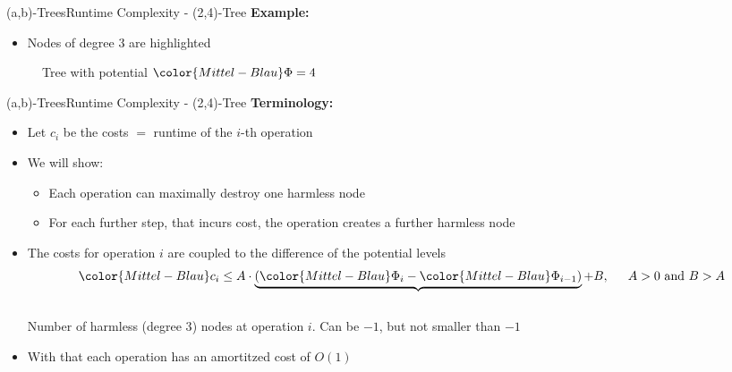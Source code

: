 \begin{frame}{(a,b)-Trees}{Runtime Complexity - (2,4)-Tree}
  \textbf{Example:}
  \begin{itemize}
    \item<2->
      Nodes of {\color{Mittel-Blau}degree 3} are highlighted
  \end{itemize}
  \begin{figure}[!h]
    \begin{adjustbox}{width=0.8\linewidth}
      
    \end{adjustbox}
    \caption{Tree with potential ${\color{Mittel-Blau}\Phi} = 4$}
    \label{fig:a_b_tree:potential_introduction}
  \end{figure}
\end{frame}


\begin{frame}{(a,b)-Trees}{Runtime Complexity - (2,4)-Tree}
  \textbf{Terminology:}
  \begin{itemize}
    \item<2->
      Let {\color{Mittel-Blau}$c_i$} be the costs $=$ runtime of the {\color{Mittel-Blau}$i$}-th operation
    \item<3->
      We will show:
      \begin{itemize}
      \item<4-> Each operation can maximally destroy one harmless node
      \item<5-> For each further step, that incurs cost, the operation
        creates a further harmless node
     \end{itemize} 
    \item<6->
      The costs for operation {\color{Mittel-Blau}$i$} are coupled to the
      difference of the potential levels
      \begin{displaymath}
        {\color{Mittel-Blau}c_i} \leq A \cdot \underbrace{(
          {\color{Mittel-Blau}\Phi_i} -
          {\color{Mittel-Blau}\Phi_{i-1}}
        )} + B, \hspace{1.5em} A > 0 \text{ and } B > A
      \end{displaymath}\\
      \vspace{-0.75em}
      Number of harmless ({\color{Mittel-Blau}degree 3}) nodes at operation
      {\color{Mittel-Blau}$i$}. Can be $-1$, but not smaller than $-1$
      \item<7->
      With that each operation has an amortitzed cost of
      {\color{Mittel-Blau}$O(1)$}
  \end{itemize}
\end{frame}

